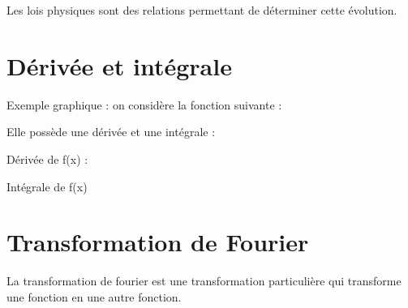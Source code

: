 \begin{appendix}
Les lois physiques sont des relations permettant de déterminer cette évolution.


\chapter{Dérivée et intégrale}

Exemple graphique : on considère la fonction suivante :
\begin{center}
\end{center}

Elle possède une dérivée et une intégrale :
\vspace{0.5cm}

\begin{minipage}[c]{.45\linewidth}
\begin{center}
Dérivée de f(x) :

\end{center}
\end{minipage}
\hfill
\begin{minipage}[c]{.45\linewidth}
\begin{center}
Intégrale de f(x)

\end{center}
\end{minipage}

\chapter{Transformation de Fourier}

La transformation de fourier est une transformation particulière qui transforme une fonction en une autre fonction.


\end{appendix}
